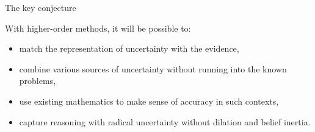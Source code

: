 \documentclass[10pt,ignorenonframetext,x11names, dvipsnames, bibspacing,natbib]{beamer}
\begin{document}
\begin{frame}{The key conjecture}

\begin{block}{With higher-order methods, it will be possible to:}

\begin{itemize}
\item
  match the representation of uncertainty with the evidence,
\item
  combine various sources of uncertainty without running into the known
  problems,
\item
  use existing mathematics to make sense of accuracy in such contexts,
\item
  capture reasoning with radical uncertainty without dilation and belief
  inertia.
\end{itemize}

\end{block}

\end{frame}
\end{document}
